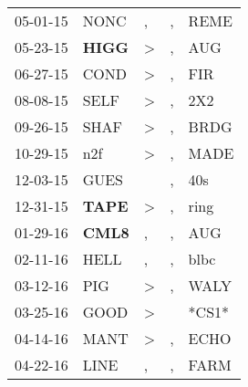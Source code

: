 \begin{supertabular}{p{0.07\textwidth}p{0.06\textwidth}p{0.02\textwidth}p{0.02\textwidth}p{0.06\textwidth}}
 05-01-15\textsuperscript{} &           NONC\textsuperscript{} &                , &             , &           REME\textsuperscript{} \\
 05-23-15\textsuperscript{} &  \textbf{HIGG\textsuperscript{}} &     \textgreater &             , &            AUG\textsuperscript{} \\
 06-27-15\textsuperscript{} &           COND\textsuperscript{} &     \textgreater &             , &            FIR\textsuperscript{} \\
 08-08-15\textsuperscript{} &           SELF\textsuperscript{} &     \textgreater &             , &            2X2\textsuperscript{} \\
 09-26-15\textsuperscript{} &           SHAF\textsuperscript{} &     \textgreater &             , &           BRDG\textsuperscript{} \\
 10-29-15\textsuperscript{} &            n2f\textsuperscript{} &     \textgreater &             , &           MADE\textsuperscript{} \\
 12-03-15\textsuperscript{} &           GUES\textsuperscript{} &                  &             , &            40s\textsuperscript{} \\
 12-31-15\textsuperscript{} &  \textbf{TAPE\textsuperscript{}} &     \textgreater &             , &           ring\textsuperscript{} \\
 01-29-16\textsuperscript{} &  \textbf{CML8\textsuperscript{}} &                , &             , &            AUG\textsuperscript{} \\
 02-11-16\textsuperscript{} &           HELL\textsuperscript{} &                , &             , &           blbc\textsuperscript{} \\
 03-12-16\textsuperscript{} &            PIG\textsuperscript{} &     \textgreater &             , &           WALY\textsuperscript{} \\
 03-25-16\textsuperscript{} &           GOOD\textsuperscript{} &     \textgreater &               &                            *CS1* \\
 04-14-16\textsuperscript{} &           MANT\textsuperscript{} &     \textgreater &             , &           ECHO\textsuperscript{} \\
 04-22-16\textsuperscript{} &           LINE\textsuperscript{} &                , &             , &           FARM\textsuperscript{} \\

\end{supertabular}
